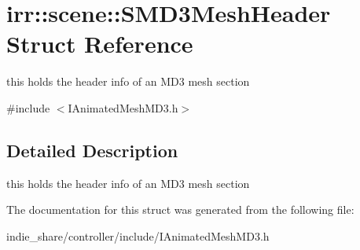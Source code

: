 \hypertarget{structirr_1_1scene_1_1SMD3MeshHeader}{}\section{irr\+:\+:scene\+:\+:S\+M\+D3\+Mesh\+Header Struct Reference}
\label{structirr_1_1scene_1_1SMD3MeshHeader}


this holds the header info of an M\+D3 mesh section  




{\ttfamily \#include $<$I\+Animated\+Mesh\+M\+D3.\+h$>$}



\subsection{Detailed Description}
this holds the header info of an M\+D3 mesh section 

The documentation for this struct was generated from the following file\+:\begin{DoxyCompactItemize}
\item 
indie\+\_\+share/controller/include/I\+Animated\+Mesh\+M\+D3.\+h\end{DoxyCompactItemize}
